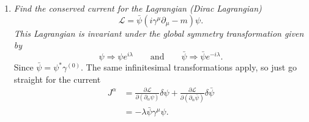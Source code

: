 \begin{example}
\begin{enumerate}
		\item \emph{Find the conserved current for the Lagrangian (Dirac Lagrangian)}
		\begin{equation}
			\mathcal{L}=\bar{\psi}(i\gamma^{\mu}\partial_\mu-m)\psi.
		\end{equation} 
		\emph{This Lagrangian is invariant under the global symmetry transformation given by}
		\begin{equation}
			\psi\Rightarrow \psi e^{i\lambda} \qquad \mbox{and} \qquad \bar{\psi}\Rightarrow \bar{\psi} e^{-i\lambda}.
		\end{equation} 
		Since $\bar{\psi}=\psi^*\gamma^{(0)}$. The same infinitesimal transformations apply, so just go straight for the current
		\begin{equation}
			\begin{split}
				J^\alpha&=\frac{\partial \mathcal{L}}{\partial (\partial_\alpha\psi )}\delta\psi+\frac{\partial \mathcal{L}}{\partial (\partial_\alpha \bar{\psi})}\delta\bar{\psi}\\
				&=-\lambda\bar{\psi}\gamma^{\mu}\psi.\\
			\end{split}
		\end{equation} 
		

\end{enumerate}
\end{example}
